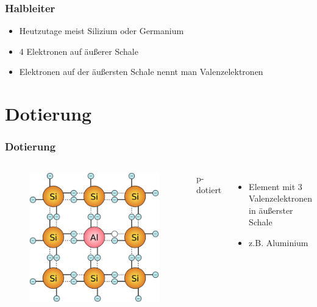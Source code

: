 \begin{frame}
  \frametitle{Halbleiter}
  \begin{center}
    \begin{itemize}
      \item Heutzutage meist Silizium oder Germanium
      \item 4 Elektronen auf äußerer Schale
      \item Elektronen auf der äußersten Schale nennt man Valenzelektronen
    \end{itemize}
  \end{center}
\end{frame}

\section*{Dotierung}

\begin{frame}
  \frametitle{Dotierung}
  \begin{columns}
    \begin{figure}
      \includegraphics[height=.6\textheight,width=\textwidth,keepaspectratio]{e12/p-dot.png}
    \end{figure}
    p-dotiert
    \begin{itemize}
      \item Element mit 3 Valenzelektronen in äußerster Schale
      \item z.B. Aluminium
    \end{itemize}
  \end{columns}
\end{frame}

